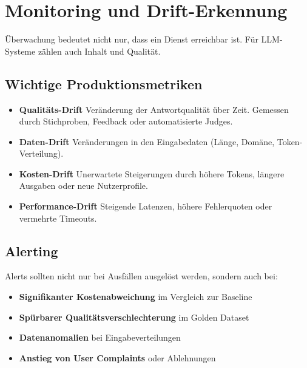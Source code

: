 
\section{Monitoring und Drift-Erkennung}

Überwachung bedeutet nicht nur, dass ein Dienst erreichbar ist. Für LLM-Systeme zählen auch Inhalt und Qualität.

\subsection{Wichtige Produktionsmetriken}

\begin{itemize}

    \item \textbf{Qualitäts-Drift} Veränderung der Antwortqualität über Zeit. Gemessen durch Stichproben, Feedback oder automatisierte Judges.
    \item \textbf{Daten-Drift} Veränderungen in den Eingabedaten (Länge, Domäne, Token-Verteilung).
    \item \textbf{Kosten-Drift} Unerwartete Steigerungen durch höhere Tokens, längere Ausgaben oder neue Nutzerprofile.
    \item \textbf{Performance-Drift} Steigende Latenzen, höhere Fehlerquoten oder vermehrte Timeouts.
\end{itemize}

\subsection{Alerting}

Alerts sollten nicht nur bei Ausfällen ausgelöst werden, sondern auch bei:

\begin{itemize}[leftmargin=*]
    \item \textbf{Signifikanter Kostenabweichung} im Vergleich zur Baseline
    \item \textbf{Spürbarer Qualitätsverschlechterung} im Golden Dataset
    \item \textbf{Datenanomalien} bei Eingabeverteilungen
    \item \textbf{Anstieg von User Complaints} oder Ablehnungen
\end{itemize}

